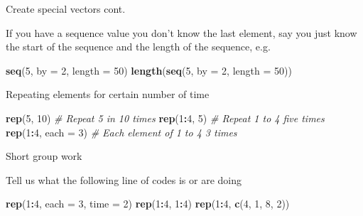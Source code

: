 \documentclass[
  ignorenonframetext,
]{beamer}
\newenvironment{Shaded}{\begin{snugshade}}{\end{snugshade}}
\newcommand{\CommentTok}[1]{\textcolor[rgb]{0.56,0.35,0.01}{\textit{#1}}}
\newcommand{\DataTypeTok}[1]{\textcolor[rgb]{0.13,0.29,0.53}{#1}}
\newcommand{\DecValTok}[1]{\textcolor[rgb]{0.00,0.00,0.81}{#1}}
\newcommand{\KeywordTok}[1]{\textcolor[rgb]{0.13,0.29,0.53}{\textbf{#1}}}
\newcommand{\NormalTok}[1]{#1}
\newcommand{\OperatorTok}[1]{\textcolor[rgb]{0.81,0.36,0.00}{\textbf{#1}}}
\begin{document}
\begin{frame}[fragile]{Create special vectors cont.}
\protect\hypertarget{create-special-vectors-cont.}{}

If you have a sequence value you don't know the last element, say you
just know the start of the sequence and the length of the sequence, e.g.

\begin{Shaded}
\begin{Highlighting}[]
\KeywordTok{seq}\NormalTok{(}\DecValTok{5}\NormalTok{, }\DataTypeTok{by =} \DecValTok{2}\NormalTok{, }\DataTypeTok{length =} \DecValTok{50}\NormalTok{)}
\KeywordTok{length}\NormalTok{(}\KeywordTok{seq}\NormalTok{(}\DecValTok{5}\NormalTok{, }\DataTypeTok{by =} \DecValTok{2}\NormalTok{, }\DataTypeTok{length =} \DecValTok{50}\NormalTok{))}
\end{Highlighting}
\end{Shaded}

Repeating elements for certain number of time

\begin{Shaded}
\begin{Highlighting}[]
\KeywordTok{rep}\NormalTok{(}\DecValTok{5}\NormalTok{, }\DecValTok{10}\NormalTok{) }\CommentTok{# Repeat 5 in 10 times}
\KeywordTok{rep}\NormalTok{(}\DecValTok{1}\OperatorTok{:}\DecValTok{4}\NormalTok{, }\DecValTok{5}\NormalTok{) }\CommentTok{# Repeat 1 to 4 five times}
\KeywordTok{rep}\NormalTok{(}\DecValTok{1}\OperatorTok{:}\DecValTok{4}\NormalTok{, }\DataTypeTok{each =} \DecValTok{3}\NormalTok{) }\CommentTok{# Each element of 1 to 4 3 times}
\end{Highlighting}
\end{Shaded}

\end{frame}

\begin{frame}[fragile]{Short group work}
\protect\hypertarget{short-group-work-1}{}

\begin{block}{Tell us what the following line of codes is or are doing}

\begin{Shaded}
\begin{Highlighting}[]
\KeywordTok{rep}\NormalTok{(}\DecValTok{1}\OperatorTok{:}\DecValTok{4}\NormalTok{, }\DataTypeTok{each =} \DecValTok{3}\NormalTok{, }\DataTypeTok{time =} \DecValTok{2}\NormalTok{)}
\KeywordTok{rep}\NormalTok{(}\DecValTok{1}\OperatorTok{:}\DecValTok{4}\NormalTok{, }\DecValTok{1}\OperatorTok{:}\DecValTok{4}\NormalTok{)}
\KeywordTok{rep}\NormalTok{(}\DecValTok{1}\OperatorTok{:}\DecValTok{4}\NormalTok{, }\KeywordTok{c}\NormalTok{(}\DecValTok{4}\NormalTok{, }\DecValTok{1}\NormalTok{, }\DecValTok{8}\NormalTok{, }\DecValTok{2}\NormalTok{))}
\end{Highlighting}
\end{Shaded}

\end{block}

\end{frame}
\end{document}

